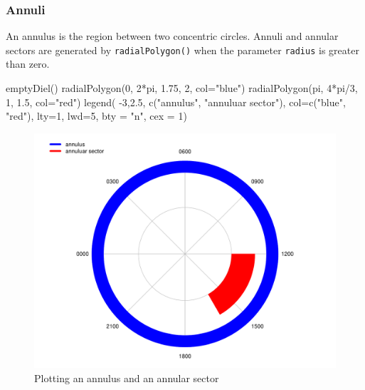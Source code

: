 \documentclass[
]{book}
\newenvironment{Shaded}{\begin{snugshade}}{\end{snugshade}}
\newcommand{\AttributeTok}[1]{\textcolor[rgb]{0.77,0.63,0.00}{#1}}
\newcommand{\DecValTok}[1]{\textcolor[rgb]{0.00,0.00,0.81}{#1}}
\newcommand{\FloatTok}[1]{\textcolor[rgb]{0.00,0.00,0.81}{#1}}
\newcommand{\FunctionTok}[1]{\textcolor[rgb]{0.00,0.00,0.00}{#1}}
\newcommand{\NormalTok}[1]{#1}
\newcommand{\SpecialCharTok}[1]{\textcolor[rgb]{0.00,0.00,0.00}{#1}}
\newcommand{\StringTok}[1]{\textcolor[rgb]{0.31,0.60,0.02}{#1}}
\begin{document}
\hypertarget{annuli}{%
\subsubsection{Annuli}\label{annuli}}

An annulus is the region between two concentric circles. Annuli and annular sectors are generated by \texttt{radialPolygon()} when the parameter \texttt{radius} is greater than zero.

\begin{Shaded}
\begin{Highlighting}[]
\FunctionTok{emptyDiel}\NormalTok{()}
\FunctionTok{radialPolygon}\NormalTok{(}\DecValTok{0}\NormalTok{, }\DecValTok{2}\SpecialCharTok{*}\NormalTok{pi, }\FloatTok{1.75}\NormalTok{, }\DecValTok{2}\NormalTok{, }\AttributeTok{col=}\StringTok{"blue"}\NormalTok{)}
\FunctionTok{radialPolygon}\NormalTok{(pi, }\DecValTok{4}\SpecialCharTok{*}\NormalTok{pi}\SpecialCharTok{/}\DecValTok{3}\NormalTok{, }\DecValTok{1}\NormalTok{, }\FloatTok{1.5}\NormalTok{, }\AttributeTok{col=}\StringTok{"red"}\NormalTok{)}
\FunctionTok{legend}\NormalTok{(}
  \SpecialCharTok{{-}}\DecValTok{3}\NormalTok{,}\FloatTok{2.5}\NormalTok{,}
  \FunctionTok{c}\NormalTok{(}\StringTok{"annulus"}\NormalTok{, }\StringTok{"annuluar sector"}\NormalTok{),}
  \AttributeTok{col=}\FunctionTok{c}\NormalTok{(}\StringTok{"blue"}\NormalTok{, }\StringTok{"red"}\NormalTok{),}
  \AttributeTok{lty=}\DecValTok{1}\NormalTok{,}
  \AttributeTok{lwd=}\DecValTok{5}\NormalTok{,}
  \AttributeTok{bty =} \StringTok{"n"}\NormalTok{,}
  \AttributeTok{cex =} \DecValTok{1}\NormalTok{)}
\end{Highlighting}
\end{Shaded}

\begin{figure}

{\centering \includegraphics[width=0.9\linewidth]{_main_files/figure-latex/radialPolygon-annuli-1} 

}

\caption{Plotting an annulus and an annular sector}\label{fig:radialPolygon-annuli}
\end{figure}
\end{document}
